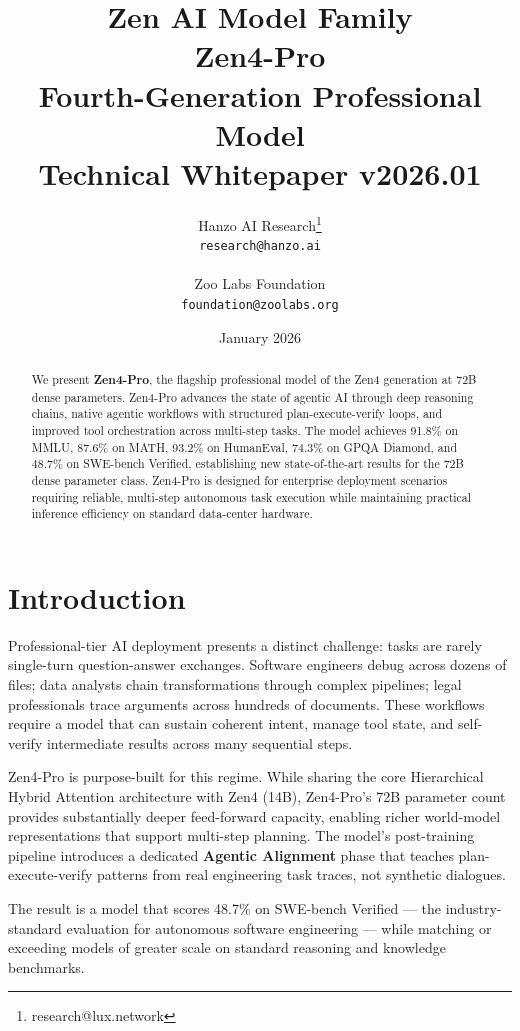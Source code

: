 \documentclass[11pt,a4paper]{article}
\title{
    \vspace{-2cm}
    \Large \textbf{Zen AI Model Family} \\
    \vspace{0.5cm}
    \Huge \textbf{Zen4-Pro} \\
    \vspace{0.3cm}
    \large Fourth-Generation Professional Model \\
    \vspace{0.5cm}
    \normalsize Technical Whitepaper v2026.01
}
\author{
    Hanzo AI Research\thanks{research@lux.network} \\
    \texttt{research@hanzo.ai} \\
    \\
    Zoo Labs Foundation \\
    \texttt{foundation@zoolabs.org}
}
\date{January 2026}
\begin{document}
\maketitle

\begin{abstract}
We present \textbf{Zen4-Pro}, the flagship professional model of the Zen4 generation at 72B dense
parameters. Zen4-Pro advances the state of agentic AI through deep reasoning chains, native
agentic workflows with structured plan-execute-verify loops, and improved tool orchestration
across multi-step tasks. The model achieves 91.8\% on MMLU, 87.6\% on MATH, 93.2\% on
HumanEval, 74.3\% on GPQA Diamond, and 48.7\% on SWE-bench Verified, establishing new
state-of-the-art results for the 72B dense parameter class. Zen4-Pro is designed for
enterprise deployment scenarios requiring reliable, multi-step autonomous task execution
while maintaining practical inference efficiency on standard data-center hardware.
\end{abstract}

\tableofcontents
\newpage

\section{Introduction}

Professional-tier AI deployment presents a distinct challenge: tasks are rarely single-turn
question-answer exchanges. Software engineers debug across dozens of files; data analysts chain
transformations through complex pipelines; legal professionals trace arguments across hundreds
of documents. These workflows require a model that can sustain coherent intent, manage tool
state, and self-verify intermediate results across many sequential steps.

Zen4-Pro is purpose-built for this regime. While sharing the core Hierarchical Hybrid Attention
architecture with Zen4 (14B), Zen4-Pro's 72B parameter count provides substantially deeper
feed-forward capacity, enabling richer world-model representations that support multi-step
planning. The model's post-training pipeline introduces a dedicated \textbf{Agentic Alignment}
phase that teaches plan-execute-verify patterns from real engineering task traces, not synthetic
dialogues.

The result is a model that scores 48.7\% on SWE-bench Verified --- the industry-standard
evaluation for autonomous software engineering --- while matching or exceeding models of greater
scale on standard reasoning and knowledge benchmarks.
\end{document}
